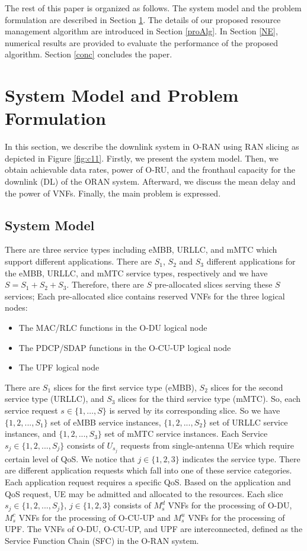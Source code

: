\documentclass[lettersize,journal]{IEEEtran}
\begin{document}
The rest of this paper is organized as follows. The system model and the problem formulation are described in Section \ref{systemmodel}. The details of our proposed resource management algorithm are introduced in Section \ref{proAlg}. In Section \ref{NE}, numerical results are provided to evaluate the performance of the proposed algorithm. Section \ref{conc} concludes the  paper.
\section{System Model and Problem Formulation}\label{systemmodel}
In this section, we describe the downlink system in O-RAN using RAN slicing as depicted in Figure \ref{fig:c11}. 
Firstly, we present the system model. Then, we obtain achievable data rates, power of O-RU, and the fronthaul capacity for the downlink (DL) of the ORAN system. Afterward, we discuss the mean delay and the power of VNFs.
Finally, the main problem is expressed.
\subsection{System Model}
There are three service types including eMBB, URLLC, and mMTC which support different applications. There are $S_1$, $S_2$ and $S_3$ different applications for the eMBB, URLLC, and mMTC service types, respectively and we have $S = S_1 + S_2 + S_3$. 
Therefore, there are $S$ pre-allocated slices serving these $S$ services;
Each pre-allocated slice contains reserved VNFs for the three logical nodes:
\begin{itemize}
\item The MAC/RLC functions in the O-DU logical node
\item The PDCP/SDAP functions in the O-CU-UP logical node
\item The UPF logical node
\end{itemize}

There are $S_1$ slices for the first service type (eMBB), $S_2$ slices for the second service type (URLLC), and $S_3$ slices for the third service type (mMTC). So, each service request $s\in \{1,\ldots,S\}$ is served by its corresponding slice. So we have 
$\{1,2,...,S_1\}$ set of eMBB service instances, $\{1,2,...,S_2\}$ set of URLLC service instances, and
$\{1,2,...,S_3\}$ set of mMTC service instances.
Each Service $s_j\in \{1,2,...,S_j\} $ consists of $U_{s_j}$ requests from  single-antenna UEs which require certain level of QoS. We notice that $j \in \{1,2,3\}$ indicates the service type.
There are different application requests which fall into one of these service categories. Each application request requires a specific QoS. Based on the application and QoS request, UE may be admitted and allocated to the resources.
Each slice $s_j \in \{1,2,...,S_j \}$, $j \in \{1,2,3\}$ consists of  $M_s^{d}$ VNFs for the processing of O-DU, $M_s^{c}$ VNFs for the processing of O-CU-UP and $M_s^{u}$ VNFs for the processing of UPF. 
The VNFs of O-DU, O-CU-UP, and UPF are interconnected, defined as the Service Function Chain (SFC) in the O-RAN system.
\end{document}
